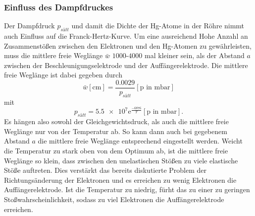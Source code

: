 \subsubsection*{Einfluss des Dampfdruckes}
Der Dampfdruck $p_{sätt}$ und damit die Dichte der Hg-Atome in der Röhre nimmt auch Einfluss auf die Franck-Hertz-Kurve. Um eine ausreichend
Hohe Anzahl an Zusammenstößen zwischen den Elektronen und den Hg-Atomen zu gewährleisten, muss die mittlere freie Weglänge $\bar{w}$ 
$\num{1000}$-$\num{4000}$ mal kleiner sein, als der Abstand $a$ zwischen der Beschleunigungselektrode und der Auffängerelektrode. Die mittlere
freie Weglänge ist dabei gegeben durch 
\begin{equation*}
    \bar{w}[\si{\centi\metre}]=\frac{\num{0.0029}}{p_{sätt}} [\text{p in } \si{\milli\bar}]
\end{equation*}
mit 
\begin{equation*}
    p_{sätt}=\num{5.5e7}\text{e}^{\frac{-6876}{T}} [\text{p in }\si{\milli\bar}] .
\end{equation*}
Es hängen also sowohl der Gleichgewichtsdruck, als auch die mittlere freie Weglänge nur von der Temperatur ab. So kann dann auch bei gegebenem
Abstand $a$ die mittlere freie Weglänge entsprechend eingestellt werden. Weicht die Temperatur zu stark oben von dem Optimum ab, ist die 
mittlere freie Weglänge so klein, dass zwischen den unelastischen Stößen zu viele elastische Stöße auftreten. Dies verstärkt das bereits 
diskutierte Problem der Richtungsänderung der Elektronen und es erreichen zu wenig Elektronen die Auffängerelektrode. Ist die Temperatur zu 
niedrig, fürht das zu einer zu geringen Stoßwahrscheinlichkeit, sodass zu viel Elektronen die Auffängerelektrode erreichen. 